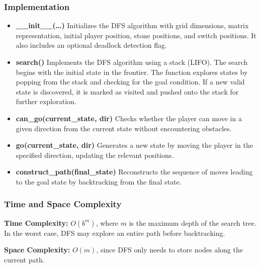 \subsubsection{Implementation}
\begin{itemize}
	\item \textbf{\_\_init\_\_(\ldots)}
	      Initializes the DFS algorithm with grid dimensions, matrix representation, initial player position, stone positions, and switch positions. It also includes an optional deadlock detection flag.

	\item \textbf{search()}
	      Implements the DFS algorithm using a stack (LIFO). The search begins with the initial state in the frontier. The function explores states by popping from the stack and checking for the goal condition. If a new valid state is discovered, it is marked as visited and pushed onto the stack for further exploration.

	\item \textbf{can\_go(current\_state, dir)}
	      Checks whether the player can move in a given direction from the current state without encountering obstacles.

	\item \textbf{go(current\_state, dir)}
	      Generates a new state by moving the player in the specified direction, updating the relevant positions.

	\item \textbf{construct\_path(final\_state)}
	      Reconstructs the sequence of moves leading to the goal state by backtracking from the final state.

\end{itemize}


\subsubsection{Time and Space Complexity}
\textbf{Time Complexity:} \( O(b^m) \), where \( m \) is the maximum depth of the search tree. In the worst case, DFS may explore an entire path before backtracking.

\textbf{Space Complexity:} \( O(m) \), since DFS only needs to store nodes along the current path.
